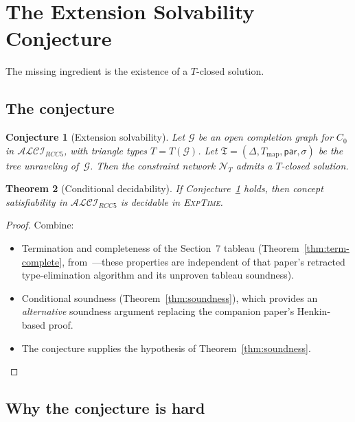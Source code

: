 \documentclass[a4paper,11pt]{article}
\newtheorem{theorem}{Theorem}[section]
\newtheorem{conjecture}[theorem]{Conjecture}
\theoremstyle{definition}
\newcommand{\ALCIRCC}[1]{\ensuremath{\mathcal{ALCI}_{\mathit{RCC#1}}}}
\newcommand{\EXPTIME}{\textsc{ExpTime}}
\begin{document}
\section{The Extension Solvability Conjecture}
\label{sec:decidability}

The missing ingredient is the existence of a $T$-closed solution.

\subsection{The conjecture}

\begin{conjecture}[Extension solvability]
\label{conj:extension-solvability}
Let $\mathcal{G}$ be an open completion graph for $C_0$ in
$\ALCIRCC{5}$, with triangle types $T = T(\mathcal{G})$.
Let $\mathfrak{T} = (\Delta, T_{\mathrm{map}}, \mathsf{par}, \sigma)$
be the tree unraveling of~$\mathcal{G}$.  Then the constraint network
$\mathcal{N}_T$ admits a $T$-closed solution.
\end{conjecture}

\begin{theorem}[Conditional decidability]
\label{thm:conditional}
If Conjecture~\ref{conj:extension-solvability} holds, then concept
satisfiability in $\ALCIRCC{5}$ is decidable in \EXPTIME.
\end{theorem}

\begin{proof}
Combine:
\begin{itemize}[nosep]
  \item Termination and completeness of the Section~7 tableau
    (Theorem~\ref{thm:term-complete},
    from~\cite{CompanionPaper}---these properties are independent
    of that paper's retracted type-elimination algorithm and its
    unproven tableau soundness).
  \item Conditional soundness (Theorem~\ref{thm:soundness}),
    which provides an \emph{alternative} soundness argument
    replacing the companion paper's Henkin-based proof.
  \item The conjecture supplies the hypothesis of
    Theorem~\ref{thm:soundness}. \qedhere
\end{itemize}
\end{proof}

\subsection{Why the conjecture is hard}
\label{sec:why-hard}
\end{document}
